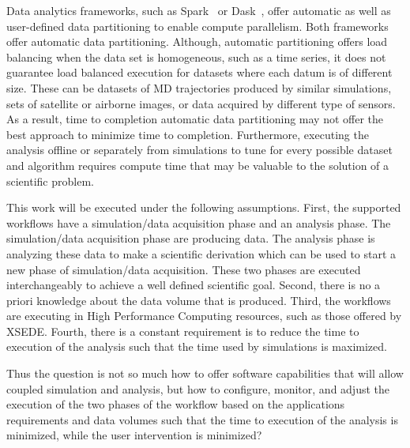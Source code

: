 Data analytics frameworks, such as Spark~\cite{zaharia2010spark} or 
Dask~\cite{rocklin2015dask},  offer automatic as well as user-defined data 
partitioning to enable compute parallelism. Both  frameworks offer automatic 
data partitioning. Although, automatic partitioning offers load balancing when 
the data set is homogeneous, such as a time series, it does not guarantee load 
balanced execution for datasets where each datum is of different size. These 
can be datasets of MD trajectories produced by similar simulations, sets of 
satellite or airborne images, or data acquired by different type of sensors. As 
a result, time to completion automatic data partitioning may not offer the best 
approach to minimize time to completion. Furthermore, executing the analysis 
offline or separately from simulations to tune for every possible dataset and 
algorithm requires compute time that may be valuable to the solution of a 
scientific problem. 

This work will be executed under the following assumptions. First, the 
supported workflows have a simulation/data acquisition phase and an analysis 
phase. The simulation/data acquisition phase are producing data. The analysis 
phase is analyzing these data to make a scientific derivation which can be used 
to start a new phase of simulation/data acquisition. These two phases are 
executed interchangeably to achieve a well defined scientific goal. Second, 
there is no a priori knowledge about the data volume that is produced. Third, 
the workflows are executing in High Performance Computing resources, such as 
those offered by XSEDE. Fourth, there is a constant requirement is to reduce 
the time to execution of the analysis such that the time used by simulations is 
maximized.


Thus the question is not so much how to offer software capabilities that will 
allow coupled simulation and analysis, but how to configure, monitor, and 
adjust the execution of  the two phases of the workflow based on the 
applications requirements and data volumes such that the time to execution of 
the analysis is minimized, while the user intervention is minimized?


